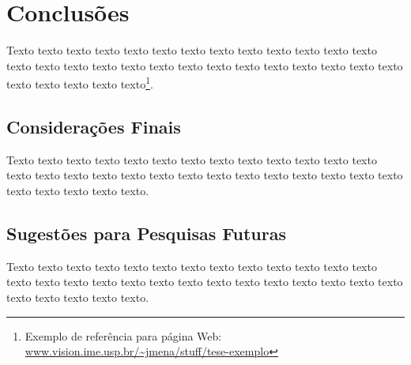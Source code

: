 \chapter{Conclusões}
\label{cap:conclusoes}

Texto texto texto texto texto texto texto texto texto texto texto texto texto
texto texto texto texto texto texto texto texto texto texto texto texto texto
texto texto texto texto texto texto\footnote{Exemplo de referência para página
Web: \url{www.vision.ime.usp.br/~jmena/stuff/tese-exemplo}}.

\section{Considerações Finais} 

Texto texto texto texto texto texto texto texto texto texto texto texto texto
texto texto texto texto texto texto texto texto texto texto texto texto texto
texto texto texto texto texto texto. 

\section{Sugestões para Pesquisas Futuras} 

Texto texto texto texto texto texto texto texto texto texto texto texto texto
texto texto texto texto texto texto texto texto texto texto texto texto texto
texto texto texto texto texto texto.
